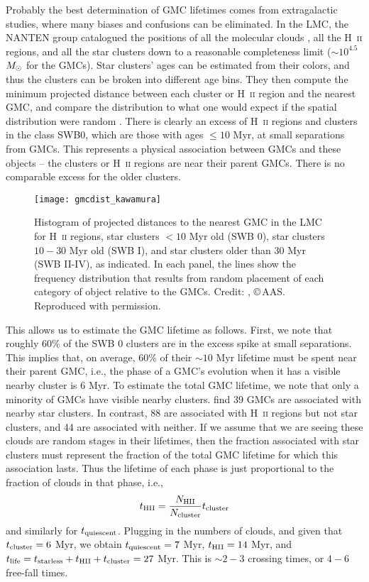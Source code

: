 Probably the best determination of GMC lifetimes comes from extragalactic studies, where many biases and confusions can be eliminated. In the LMC, the NANTEN group catalogued the positions of all the molecular clouds \citet{fukui08a}, all the H~\textsc{ii} regions, and all the star clusters down to a reasonable completeness limit ($\sim 10^{4.5}$ $M_{\odot}$ for the GMCs). Star clusters' ages can be estimated from their colors, and thus the clusters can be broken into different age bins. They then compute the minimum projected distance between each cluster or H~\textsc{ii} region and the nearest GMC, and compare the distribution to what one would expect if the spatial distribution were random \citet[Figure \ref{fig:gmcdist_kawamura}]{kawamura09a}. There is clearly an excess of H~\textsc{ii} regions and clusters in the class SWB0, which are those with ages $\leq 10$ Myr, at small separations from GMCs. This represents a physical association between GMCs and these objects -- the clusters or H~\textsc{ii} regions are near their parent GMCs. There is no comparable excess for the older clusters. 

\begin{figure}
\texttt{[image: gmcdist\_kawamura]}
\caption[Histogram of distances to nearest GMC]{
\label{fig:gmcdist_kawamura}
Histogram of projected distances to the nearest GMC in the LMC for H~\textsc{ii} regions, star clusters $<10$ Myr old (SWB 0), star clusters $10-30$ Myr old (SWB I), and star clusters older than 30 Myr (SWB II-IV), as indicated. In each panel, the lines show the frequency distribution that results from random placement of each category of object relative to the GMCs. Credit: \citet{kawamura09a}, \copyright\,AAS. Reproduced with permission.
}
\end{figure}

This allows us to estimate the GMC lifetime as follows. First, we note that roughly 60\% of the SWB 0 clusters are in the excess spike at small separations. This implies that, on average, 60\% of their $\sim 10$ Myr lifetime must be spent near their parent GMC, i.e., the phase of a GMC's evolution when it has a visible nearby cluster is 6 Myr. To estimate the total GMC lifetime, we note that only a minority of GMCs have visible nearby clusters. \citet{kawamura09a} find 39 GMCs are associated with nearby star clusters. In contrast, 88 are associated with H~\textsc{ii} regions but not star clusters, and 44 are associated with neither. If we assume that we are seeing these clouds are random stages in their lifetimes, then the fraction associated with star clusters must represent the fraction of the total GMC lifetime for which this association lasts. Thus the lifetime of each phase is just proportional to the fraction of clouds in that phase, i.e.,
\begin{equation}
t_{\rm HII} = \frac{N_{\rm HII}}{N_{\rm cluster}} t_{\rm cluster}
\end{equation}
and similarly for $t_{\rm quiescent}$.
Plugging in the numbers of clouds, and given that $t_{\rm cluster}=6$ Myr, we obtain $t_{\rm quiescent} = 7$ Myr, $t_{\rm HII} = 14$ Myr, and $t_{\rm life} = t_{\rm starless} + t_{\rm HII} + t_{\rm cluster} = 27$ Myr. This is $\sim 2-3$ crossing times, or $4-6$ free-fall times.

